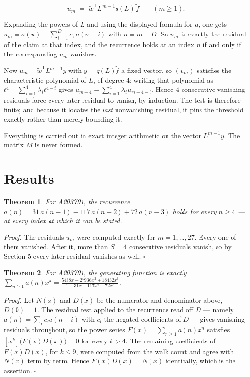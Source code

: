 \documentclass[11pt]{article}
\newtheorem{theorem}{Theorem}
\theoremstyle{definition}
\begin{document}
\[u_m \;=\; \tilde w^{\mathsf T} L^{\,m-1} q(L)\,\tilde f \qquad (m \ge 1).\]

Expanding the powers of $L$ and using the displayed formula for $a$, one gets $u_m = a(n) - \sum_{i=1}^{D} c_i\,a(n-i)$ with $n = m + D$. So $u_m$ is exactly the residual of the claim at that index, and the recurrence holds at an index $n$ if and only if the corresponding $u_m$ vanishes.

Now $u_m = \tilde w^{\mathsf T} L^{m-1} y$ with $y = q(L)\tilde f$ a fixed vector, so $(u_m)$ satisfies the characteristic polynomial of $L$, of degree $4$: writing that polynomial as $t^{4} - \sum_{i=1}^{4} \lambda_i t^{4-i}$ gives $u_{m+4} = \sum_{i=1}^{4} \lambda_i u_{m+4-i}$. Hence $4$ consecutive vanishing residuals force every later residual to vanish, by induction. The test is therefore finite; and because it locates the {\itshape last} nonvanishing residual, it pins the threshold exactly rather than merely bounding it.

Everything is carried out in exact integer arithmetic on the vector $L^{m-1}y$. The matrix $M$ is never formed.

\section{Results}

\begin{theorem} For A203791, the recurrence $a(n) = 31\,a(n-1) - 117\,a(n-2) + 72\,a(n-3)$ holds for every $n \ge 4$ --- at every index at which it can be stated.\end{theorem}

{\itshape Proof.} The residuals $u_m$ were computed exactly for $m = 1,\dots,27$. Every one of them vanished. After it, more than $S = 4$ consecutive residuals vanish, so by Section 5 every later residual vanishes as well. $\square$

\begin{theorem} For A203791, the generating function is exactly $\sum_{n\ge 1} a(n)x^n = \frac{5488x - 27936x^{2} + 18432x^{3}}{1 - 31x + 117x^{2} - 72x^{3}}$.\end{theorem}

{\itshape Proof.} Let $N(x)$ and $D(x)$ be the numerator and denominator above, $D(0)=1$. The residual test applied to the recurrence read off $D$ --- namely $a(n) = \sum_i c_i a(n-i)$ with $c_i$ the negated coefficients of $D$ --- gives vanishing residuals throughout, so the power series $F(x)=\sum_{n\ge 1}a(n)x^n$ satisfies $[x^k]\bigl(F(x)D(x)\bigr) = 0$ for every $k > 4$. The remaining coefficients of $F(x)D(x)$, for $k \le 9$, were computed from the walk count and agree with $N(x)$ term by term. Hence $F(x)D(x) = N(x)$ identically, which is the assertion. $\square$
\end{document}
